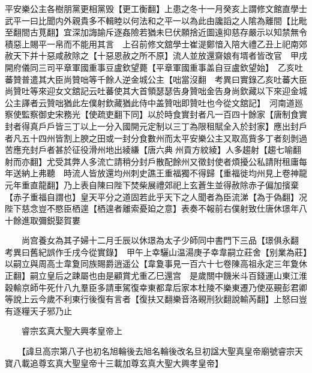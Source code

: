 平安樂公主各樹朋黨更相黨毁【更工衡翻】上患之冬十一月癸亥上謂修文館直學士武平一曰比聞内外親貴多不輯睦以何法和之平一以為此由讒謟之人隂為離間【比毗至翻間古莧翻】宜深加誨諭斥逐姦險若猶未巳伏願捨近圖遠抑慈存嚴示以知禁無令積惡上賜平一帛而不能用其言　上召前修文舘學士崔湜鄭愔入陪大禮乙丑上祀南郊赦天下并十惡咸赦除之【十惡恩赦之所不原】流人並放還齋娘有壻者皆改官　甲戌開府儀同三司平章軍國重事豆盧欽望薨【平章軍國重事盖自豆盧欽望始】　乙亥吐蕃贊普遣其大臣尚贊咄等千餘人逆金城公主【咄當沒翻　考異曰實錄乙亥吐蕃大臣尚贊吐等來迎女文舘記云吐蕃使其大首領瑟瑟告身贊咄金告身尚欽藏以下來迎金城公主譯者云贊咄猶此左僕射欽藏猶此侍中盖贊咄即贊吐也今從文舘記】　河南道廵察使監察御史宋務光【使疏吏翻下同】以於時食實封者凡一百四十餘家【唐制食實封者得真戶戶皆三丁以上一分入國開元定制以三丁為限租賦全入於封家】應出封戶者凡五十四州皆割上腴之田或一封分食數州而太平安樂公主又取高貲多丁者刻剝過苦應充封戶者甚於征役滑州地出綾縑【唐六典州貢方紋綾】人多趨射【趨七喻翻射而亦翻】尤受其弊人多流亡請稍分封戶散配餘州又徵封使者煩擾公私請附租庸每年送納上弗聽　時流人皆放還均州刺史譙王重福獨不得歸【重福徙均州見上卷神龍元年重直龍翻】乃上表自陳曰陛下焚柴展禮郊祀上玄蒼生並得赦除赤子偏加擯棄【赤子重福自謂也】皇天平分之道固若此乎天下之人聞者為臣流涕【為于偽翻】况陛下慈念豈不愍臣栖遑【栖遑者離索憂廹之意】表奏不報前右僕射致仕唐休璟年八十餘進取彌鋭娶賀婁

　　尚宫養女為其子婦十二月壬辰以休璟為太子少師同中書門下三品【璟俱永翻　考異曰舊紀誤作壬戌今從實錄】　甲午上幸驪山温湯庚子幸韋嗣立莊舍【别業為莊】以嗣立與周高士韋夐同族賜爵逍遥公【韋夐事見一百六十七卷陳高祖永定三年夐休正翻】嗣立皇后之踈屬也由是顧賞尤重乙巳還宫　是歲關中饑米斗百錢運山東江淮穀輸京師牛死什八九羣臣多請車駕復幸東都韋后家本杜陵不樂東遷乃使巫覡彭君卿等說上云今歲不利東行後復有言者【復扶又翻樂音洛覡刑狄翻說輸芮翻】上怒曰豈有逐糧天子邪乃止

　　睿宗玄真大聖大興孝皇帝上

　　【諱旦高宗第八子也初名旭輪後去旭名輪後改名旦初諡大聖真皇帝廟號睿宗天寶八載追尊玄真大聖皇帝十三載加尊玄真大聖大興孝皇帝】

